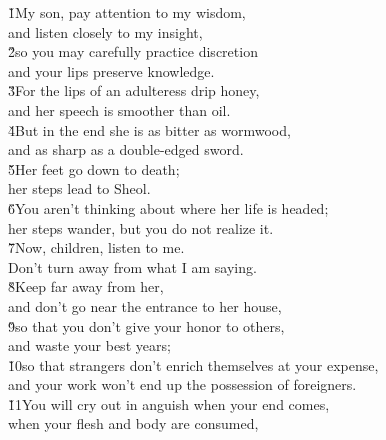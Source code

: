 \begin{poetry}
\poeml {}
\v{1}My son, pay attention to my wisdom, \\
\poeml and listen closely to my insight, \\
\poeml \v{2}so you may carefully practice discretion \\
\poemll    and your lips preserve knowledge. \\
\poeml \v{3}For the lips of an adulteress drip honey, \\
\poemll    and her speech is smoother than oil. \\
\poeml \v{4}But in the end she is as bitter as wormwood, \\
\poemll    and as sharp as a double-edged sword. \\
\poeml \v{5}Her feet go down to death; \\
\poemll    her steps lead to Sheol. \\
\poeml \v{6}You aren't thinking about where her life is headed; \\
\poemll    her steps wander, but you do not realize it. \\
\poeml \v{7}Now, children, listen to me. \\
\poemll    Don't turn away from what I am saying. \\
\poeml \v{8}Keep far away from her, \\
\poemll    and don't go near the entrance to her house, \\
\poeml \v{9}so that you don't give your honor to others, \\
\poemll    and waste your best years; \\
\poeml \v{10}so that strangers don't enrich themselves at your expense, \\
\poemll    and your work won't end up the possession of foreigners. \\
\poeml \v{11}You will cry out in anguish when your end comes, \\
\poemll    when your flesh and body are consumed, \\

\end{poetry}
